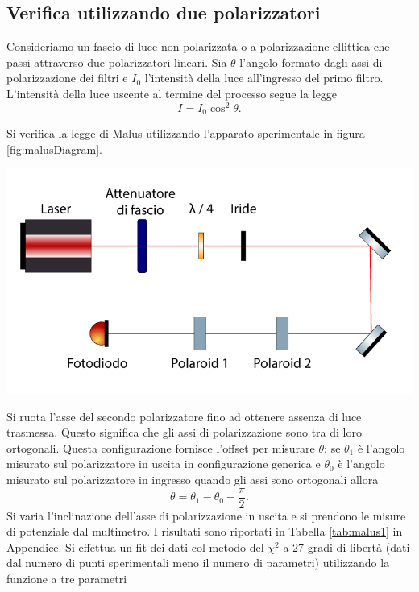 \documentclass[10pt,oneside,a4paper]{article}
\newenvironment{Figure}
  {\par\medskip\noindent\minipage{\linewidth}}
  {\endminipage\par\medskip}
\begin{document}
\begin{multicols}{2}
\subsection{Verifica utilizzando due polarizzatori}

Consideriamo un fascio di luce non polarizzata o a polarizzazione ellittica che passi attraverso due polarizzatori lineari. Sia $\theta$ l'angolo formato dagli assi di polarizzazione dei filtri e $I_0$ l'intensità della luce all'ingresso del primo filtro. L'intensità della luce uscente al termine del processo segue la legge
\begin{equation}\label{eq:Malus1}
  I = I_0\cos^2\theta.
\end{equation}

Si verifica la legge di Malus utilizzando l'apparato sperimentale in figura \ref{fig:malusDiagram}. 
\begin{Figure}
	\begin{center}
	\includegraphics[width=\linewidth]{malus1Diagram.png}
	\label{fig:malusDiagram}
	\end{center}
\end{Figure}
Si ruota l'asse del secondo polarizzatore fino ad ottenere assenza di luce trasmessa. Questo significa che gli assi di polarizzazione sono tra di loro ortogonali. Questa configurazione fornisce l'offset per misurare $\theta$: se $\theta_1$ è l'angolo misurato sul polarizzatore in uscita in configurazione generica e $\theta_0$ è l'angolo misurato sul polarizzatore in ingresso quando gli assi sono ortogonali allora
\[
\theta = \theta_1 - \theta_0 - \frac{\pi}{2}.
\]
Si varia l'inclinazione dell'asse di polarizzazione in uscita e si prendono le misure di potenziale dal multimetro. I risultati sono riportati in Tabella \ref{tab:malus1} in Appendice. Si effettua un fit dei dati col metodo del $\chi^2$ a 27 gradi di libertà (dati dal numero di punti sperimentali meno il numero di parametri) utilizzando la funzione a tre parametri

\end{multicols}
\end{document}
